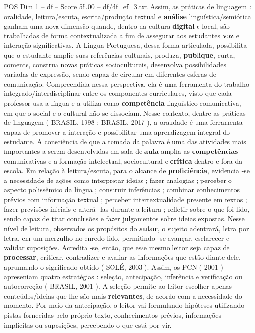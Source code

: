 \begin{textsample}{POS Dim 1 – df – Score 55.00 – df/df\_ef\_3.txt}
Assim, as práticas de linguagem : oralidade, leitura/escuta, escrita/produção textual e \textbf{análise} linguística/semiótica ganham uma nova dimensão quando, dentro da cultura \textbf{digital} e local, são trabalhadas de forma contextualizada a fim de assegurar aos estudantes \textbf{voz} e interação significativas.
A Língua Portuguesa, dessa forma articulada, possibilita que o estudante amplie suas referências culturais, produza, \textbf{publique}, curta, comente, construa novas práticas socioculturais, desenvolva possibilidades variadas de expressão, sendo capaz de circular em diferentes esferas de comunicação.
Compreendida nessa perspectiva, ela é uma ferramenta do trabalho integrado/interdisciplinar entre os componentes curriculares, visto que cada professor usa a língua e a utiliza como \textbf{competência} linguístico-comunicativa, em que o social e o cultural não se dissociam.
Nesse contexto, dentre as práticas de linguagem ( BRASIL, 1998 ; BRASIL, 2017 ), a oralidade é uma ferramenta capaz de promover a interação e possibilitar uma aprendizagem integral do estudante.
A consciência de que a tomada da palavra é uma das atividades mais importantes a serem desenvolvidas em sala de \textbf{aula} amplia as \textbf{competências} comunicativas e a formação intelectual, sociocultural e \textbf{crítica} dentro e fora da escola.
Em relação à leitura/escuta, para o alcance de \textbf{proficiência}, evidencia -se a necessidade de ações como interpretar ideias ; fazer analogias ; perceber o aspecto polissêmico da língua ; construir inferências ; combinar conhecimentos prévios com informação textual ; perceber intertextualidade presente em textos ; fazer previsões iniciais e alterá -las durante a leitura ; refletir sobre o que foi lido, sendo capaz de tirar conclusões e fazer julgamentos sobre ideias expostas.
Nesse nível de leitura, observados os propósitos do \textbf{autor}, o sujeito adentrará, letra por letra, em um mergulho no enredo lido, permitindo -se avançar, esclarecer e validar suposições.
Acredita -se, então, que esse mesmo leitor seja capaz de \textbf{processar}, criticar, contradizer e avaliar as informações que estão diante dele, aprumando o significado obtido ( SOLÉ, 2003 ).
Assim, os PCN ( 2001 ) apresentam quatro estratégias : seleção, antecipação, inferência e verificação ou autocorreção ( BRASIL, 2001 ).
A seleção permite ao leitor escolher apenas conteúdos/ideias que lhe são mais \textbf{relevantes}, de acordo com a necessidade do momento.
Por meio da antecipação, o leitor vai formulando hipóteses utilizando pistas fornecidas pelo próprio texto, conhecimentos prévios, informações implícitas ou suposições, percebendo o que está por vir.

\end{textsample}
